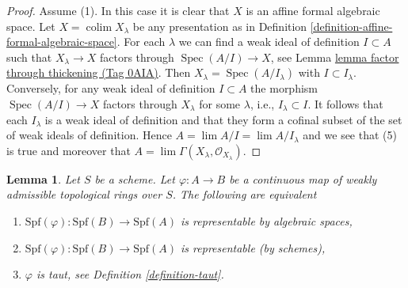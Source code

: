 \documentclass{amsart}
\theoremstyle{plain}
\newtheorem{lemma}[subsection]{Lemma}
\theoremstyle{definition}
\theoremstyle{remark}
\numberwithin{equation}{subsection}
\def\lim{\mathop{\mathrm{lim}}\nolimits}
\def\colim{\mathop{\mathrm{colim}}\nolimits}
\def\Spec{\mathop{\mathrm{Spec}}}
\begin{document}
\begin{proof}
\medskip\noindent
Assume (1). In this case it is clear that $X$ is an affine formal
algebraic space. Let $X = \colim X_\lambda$ be any presentation as in
Definition \ref{definition-affine-formal-algebraic-space}.
For each $\lambda$ we can find a weak ideal of definition
$I \subset A$ such that $X_\lambda \to X$ factors through
$\Spec(A/I) \to X$, see Lemma \href{https://stacks.math.columbia.edu/tag/0AIA}{lemma factor through thickening (Tag 0AIA)}.
Then $X_\lambda = \Spec(A/I_\lambda)$ with $I \subset I_\lambda$.
Conversely, for any weak ideal of definition $I \subset A$
the morphism $\Spec(A/I) \to X$ factors through $X_\lambda$
for some $\lambda$, i.e., $I_\lambda \subset I$.
It follows that each $I_\lambda$ is a weak ideal of definition
and that they form a cofinal subset of the set of weak ideals
of definition. Hence $A = \lim A/I = \lim A/I_\lambda$
and we see that (5) is true and moreover that
$A = \lim \Gamma(X_\lambda, \mathcal{O}_{X_\lambda})$.
\end{proof}


\begin{lemma}
\label{lemma-representable-affine}
Let $S$ be a scheme. Let $\varphi : A \to B$ be a continuous map of
weakly admissible topological rings over $S$. The following
are equivalent
\begin{enumerate}
\item $\text{Spf}(\varphi) : \text{Spf}(B) \to \text{Spf}(A)$
is representable by algebraic spaces,
\item $\text{Spf}(\varphi) : \text{Spf}(B) \to \text{Spf}(A)$
is representable (by schemes),
\item $\varphi$ is taut, see Definition \ref{definition-taut}.
\end{enumerate}
\end{lemma}
\end{document}

